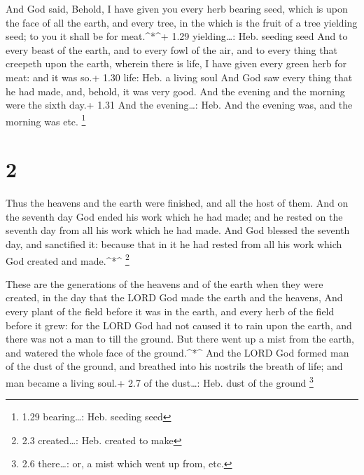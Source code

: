  And God said, Behold, I have given you every herb bearing
seed, which is upon the face of all the earth, and every tree, in the
which is the fruit of a tree yielding seed; to you it shall be for
meat.\^{}*\^{}+ 1.29 yielding\ldots: Heb. seeding seed  And
to every beast of the earth, and to every fowl of the air, and to every
thing that creepeth upon the earth, wherein there is life, I have given
every green herb for meat: and it was so.+ 1.30 life: Heb. a living soul
 And God saw every thing that he had made, and, behold, it
was very good. And the evening and the morning were the sixth day.+ 1.31
And the evening\ldots: Heb. And the evening was, and the morning was
etc. \footnote{1.29 bearing\ldots: Heb. seeding seed}

\hypertarget{section-1}{%
\section{2}\label{section-1}}

 Thus the heavens and the earth were finished, and all the
host of them.  And on the seventh day God ended his work
which he had made; and he rested on the seventh day from all his work
which he had made.  And God blessed the seventh day, and
sanctified it: because that in it he had rested from all his work which
God created and made.\^{}*\^{} \footnote{2.3 created\ldots: Heb. created
  to make}

 These are the generations of the heavens and of the earth
when they were created, in the day that the LORD God made the earth and
the heavens,  And every plant of the field before it was in
the earth, and every herb of the field before it grew: for the LORD God
had not caused it to rain upon the earth, and there was not a man to
till the ground.  But there went up a mist from the earth,
and watered the whole face of the ground.\^{}*\^{}  And the
LORD God formed man of the dust of the ground, and breathed into his
nostrils the breath of life; and man became a living soul.+ 2.7 of the
dust\ldots: Heb. dust of the ground \footnote{2.6 there\ldots: or, a
  mist which went up from, etc.}

